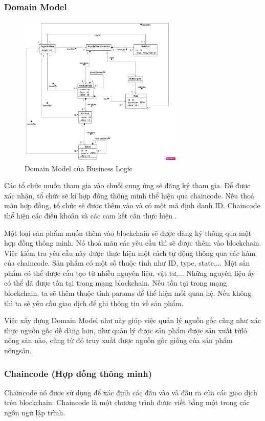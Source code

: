 \subsubsection{Domain Model}

\begin{figure}[h]
    \centering
    \includegraphics[width=0.7\textwidth]{images/domain_model.png}
    \caption{Domain Model của Business Logic } 
\end{figure}

Các tổ chức muốn tham gia vào chuỗi cung ứng sẽ đăng ký tham gia. Để được xác nhận, 
tổ chức sẽ kí hợp đồng thông minh thể hiện qua chaincode. Nếu thoả mãn hợp đồng, 
tổ chức sẽ được thêm vào và có một mã định danh ID. Chaincode thể hiện các điều khoản
và các cam kết cần thực hiện \cite{app}.

Một loại sản phẩm muốn thêm vào blockchain sẽ được đăng ký thông qua một hợp đồng 
thông minh. Nó thoả mãn các yêu cầu thì sẽ được thêm vào blockchain. Việc kiểm tra 
yêu cầu này được thực hiện một cách tự động thông qua các hàm của chaincode. Sản phẩm có một 
số thuộc tính như ID, type, state,...
Một sản phẩm có thể được cấu tạo từ nhiều nguyên liệu, vật tư,... Những nguyên liệu ấy
có thể đã được tồn tại trong mạng blockchain. Nếu tồn tại trong mạng blockchain, ta sẽ thêm 
thuộc tính params để thể hiện mối quan hệ. Nếu không thì ta sẽ yêu cầu giao dịch
để ghi thông tin về sản phẩm. 

Việc xây dựng Domain Model như này giúp việc quản lý nguồn gốc cũng như xác thực nguồn gốc 
dễ dàng hơn, như quản lý được sản phẩm được sản xuất từlô nông sản nào, cũng từ đó truy xuất được nguồn gốc giống của sản phẩm nôngsản.
\subsubsection{Chaincode (Hợp đồng thông minh)}
Chaincode nó được sử dụng để xác định các đầu vào và đầu ra của các giao dịch trên blockchain. Chaincode là một chương trình được 
viết bằng một trong các ngôn ngữ lập trình.

